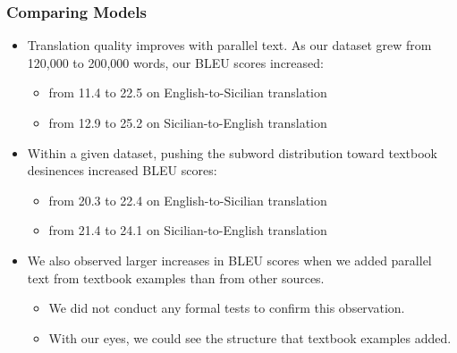 \documentclass{beamer}
\begin{document}
\begin{frame}
  \frametitle{Comparing Models}
  \vspace{-1.0em}
  \begin{itemize}
  \item Translation quality improves with parallel text.  As our dataset grew
    from 120,000 to 200,000 words, our BLEU scores increased:
    \begin{itemize}
    \item from 11.4 to 22.5 on English-to-Sicilian translation
    \item from 12.9 to 25.2 on Sicilian-to-English translation
    \end{itemize}
  \vspace{0.5em}
  \item Within a given dataset, pushing the subword distribution toward textbook desinences increased BLEU scores:
    \begin{itemize}
    \item from 20.3 to 22.4 on English-to-Sicilian translation
    \item from 21.4 to 24.1 on Sicilian-to-English translation
    \end{itemize}
  \vspace{0.5em}
  \item We also observed larger increases in BLEU scores when we added parallel text from 
    textbook examples than from other sources.
    \begin{itemize}
    \item We did not conduct any formal tests to confirm this observation.
    \item With our eyes, we could see the structure that textbook examples added.
    \end{itemize}
  \end{itemize} 
\end{frame}

\end{document}
